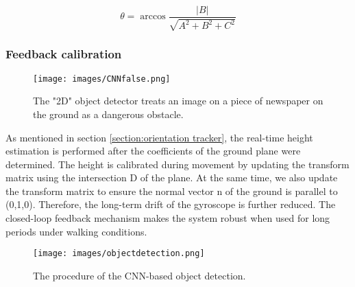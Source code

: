 \documentclass{ieeeaccess}
\begin{document}
\begin{equation}
\theta=\arccos{\frac{|B|}{\sqrt{A^2+B^2+C^2}}}
\label{formula:inclination angle}
\end{equation}

\subsubsection{Feedback calibration}
\begin{figure}
    \centering
    \texttt{[image: images/CNNfalse.png]}
    \caption{The "2D" object detector treats an image on a piece of newspaper on the ground as a dangerous obstacle.}
    \label{fig:cnn-false}
\end{figure}

As mentioned in section \ref{section:orientation tracker}, the real-time height estimation is performed after the coefficients of the ground plane were determined. The height is calibrated during movement by updating the transform matrix using the intersection D of the plane. At the same time, we also update the transform matrix to ensure the normal vector n of the ground is parallel to (0,1,0). Therefore, the long-term drift of the gyroscope is further reduced. The closed-loop feedback mechanism makes the system robust when used for long periods under walking conditions.
\begin{figure}[b]
    \centering
    \texttt{[image: images/objectdetection.png]}
    \caption{The procedure of the CNN-based object detection.}
    \label{fig:objectdetection_procedure}
\end{figure}
\end{document}
